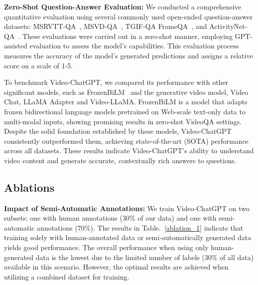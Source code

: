 \noindent\textbf{Zero-Shot Question-Answer Evaluation: } 
We conducted a comprehensive quantitative evaluation using several commonly used open-ended question-answer datasets: MSRVTT-QA~\cite{xu2017video}, MSVD-QA~\cite{xu2017video}, TGIF-QA FrameQA~\cite{jang2017tgif}, and ActivityNet-QA~\cite{yu2019activitynet}. These evaluations were carried out in a zero-shot manner, employing GPT-assisted evaluation to assess the model's capabilities. This evaluation process measures the accuracy of the model's generated predictions and assigns a relative score on a scale of 1-5.

To benchmark Video-ChatGPT, we compared its performance with other significant models, such as FrozenBiLM~\cite{yang2022zero} and the generative video model, Video Chat, LLaMA Adapter and Video-LLaMA. FrozenBiLM is a model that adapts frozen bidirectional language models pretrained on Web-scale text-only data to multi-modal inputs, showing promising results in zero-shot VideoQA settings. Despite the solid foundation established by these models, Video-ChatGPT consistently outperformed them, achieving state-of-the-art (SOTA) performance across all datasets. These results indicate Video-ChatGPT's ability to understand video content and generate accurate, contextually rich answers to questions.

\subsection{Ablations}

\noindent
\textbf{Impact of Semi-Automatic Annotations: } We train Video-ChatGPT on two subsets: one with human annotations (30\% of our data) and one with semi-automatic annotations (70\%). The results in Table.~\ref{ablation_1} indicate that training solely with human-annotated data or semi-automatically generated data yields good performance.  The overall performance when using only human-generated data is the lowest due to the limited number of labels (30\% of all data) available in this scenario. However, the optimal results are achieved when utilizing a combined dataset for training.

